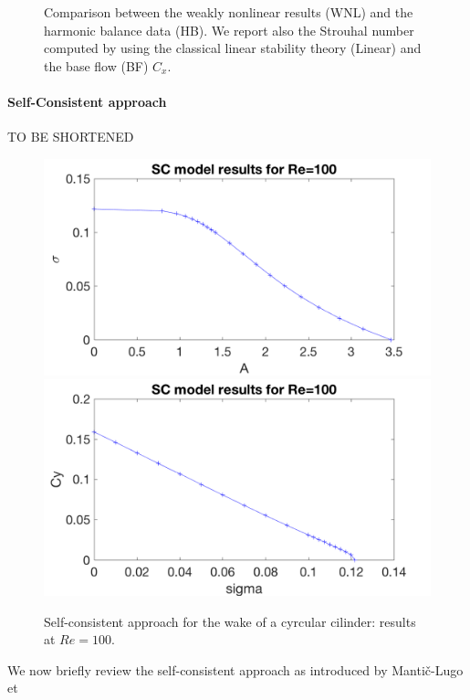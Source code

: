 \documentclass[twocolumn,10pt]{asme2ej}
\begin{document}
\begin{figure}
\begin{center}
\end{center}
\caption{Comparison between the weakly nonlinear results (WNL) and the harmonic 
balance data (HB). We report also the Strouhal number computed by using the 
classical linear stability theory (Linear) and the base flow (BF) $C_x$.
}
\label{fig:Comp2}
\end{figure}


\paragraph{Self-Consistent approach}

TO BE SHORTENED

\begin{figure}
\begin{center}
\includegraphics[width=.9 \linewidth]{Cylinder_SC100_EnergySigma.png}
\includegraphics[width=.9 \linewidth]{Cylinder_SC100_CySigma.png}
\end{center}
\caption{Self-consistent approach for the wake of a cyrcular cilinder: results at $Re = 
100$.}
\label{fig:SC100}
\end{figure}
We now briefly review the self-consistent approach as introduced by Manti\v{c}-Lugo et 
\end{document}
